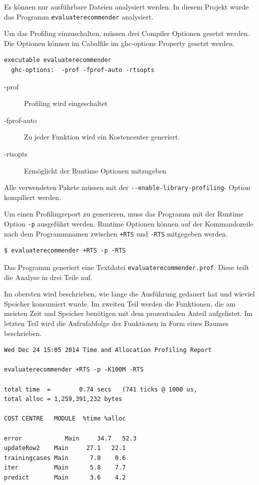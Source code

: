 \documentclass[a4paper, 12pt]{article}
\begin{document}
Es können nur ausführbare Dateien analysiert werden. In diesem Projekt wurde das Programm \verb|evaluaterecommender| analysiert.

Um das Profiling einzuschalten, müssen drei Compiler Optionen gesetzt werden. Die Optionen können im Cabalfile im ghc-options Property gesetzt werden.
\begin{verbatim}
executable evaluaterecommender
  ghc-options:	-prof -fprof-auto -rtsopts
\end{verbatim}
\begin{description}
\item[-prof] Profiling wird eingeschaltet
\item[-fprof-auto] Zu jeder Funktion wird ein Kostencenter generiert.
\item[-rtsopts] Ermöglicht der Runtime Optionen mitzugeben
\end{description}

Alle verwendeten Pakete müssen mit der \verb|--enable-library-profiling|- Option kompiliert werden.

Um einen Profilingreport zu generieren, muss das Programm mit der Runtime Option \verb|-p| ausgeführt werden. Runtime Optionen können auf der Kommandozeile nach dem Programmnamen zwischen \verb|+RTS| und \verb|-RTS| mitgegeben werden.  

\begin{verbatim}
$ evaluaterecommender +RTS -p -RTS
\end{verbatim}

Das Programm generiert eine Textdatei \verb|evaluaterecommender.prof|. Diese teilt die Analyse in drei Teile auf.

Im obersten wird beschrieben, wie lange die Ausführung gedauert hat und wieviel Speicher konsumiert wurde. Im zweiten Teil werden die Funktionen, die am meisten Zeit und Speicher benötigen mit dem prozentualen Anteil aufgelistet. Im letzten Teil wird die Aufrufabfolge der Funktionen in Form eines Baumes beschrieben.

\begin{verbatim}
Wed Dec 24 15:05 2014 Time and Allocation Profiling Report 

evaluaterecommender +RTS -p -K100M -RTS

total time  =        0.74 secs   (741 ticks @ 1000 us,
total alloc = 1,259,391,232 bytes 

COST CENTRE   MODULE  %time %alloc

error            Main     34.7   52.3
updateRow2    Main     27.1   22.1
trainingcases Main      7.8    0.6
iter          Main      5.8    7.7
predict       Main      3.6    4.2

\end{verbatim}
\end{document}
